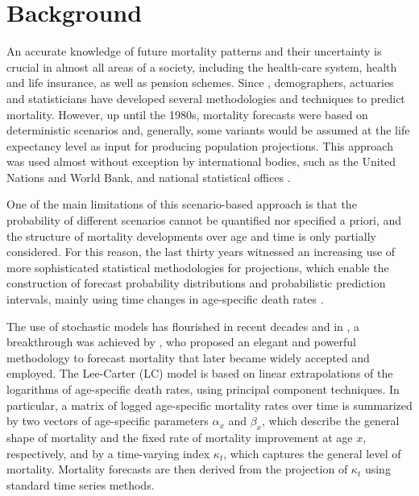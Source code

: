 \documentclass[Thesis]{subfiles}
\begin{document}
\newpage


\normalsize

\section{Background}\label{Sec:Ch6sec1}
An accurate knowledge of future mortality patterns and their uncertainty is crucial in almost all areas of a society, including the health-care system, health and life insurance, as well as pension schemes. Since \cite{bonynge1852future}, demographers, actuaries and statisticians have developed several methodologies and techniques to predict mortality. However, up until the 1980s, mortality forecasts were based on deterministic scenarios and, generally, some variants would be assumed at the life expectancy level as input for producing population projections. This approach was used almost without exception by international bodies, such as the United Nations and World Bank, and national statistical offices \citep{booth2006demographic}. 

One of the main limitations of this scenario-based approach is that the probability of different scenarios cannot be quantified nor specified a priori, and the structure of mortality developments over age and time is only partially considered. For this reason, the last thirty years witnessed an increasing use of more sophisticated statistical methodologies for projections, which enable the construction of forecast probability distributions and probabilistic prediction intervals, mainly using time changes in age-specific death rates \citep{booth2008mortality}.

The use of stochastic models has flourished in recent decades \citep[for comprehensive reviews, see][]{booth2006demographic,booth2008mortality, stoeldraijer2013impact} and in \citeyear{lee1992modeling}, a breakthrough was achieved by \citeauthor{lee1992modeling}, who proposed an elegant and powerful methodology to forecast mortality that later became widely accepted and employed. The Lee-Carter (LC) model is based on linear extrapolations of the logarithms of age-specific death rates, using principal component techniques. In particular, a matrix of logged age-specific mortality rates over time is summarized by two vectors of age-specific parameters $\alpha_x$ and $\beta_x$, which describe the general shape of mortality and the fixed rate of mortality improvement at age $x$, respectively, and by a time-varying index $\kappa_t$, which captures the general level of mortality. Mortality forecasts are then derived from the projection of $\kappa_t$ using standard time series methods.
\end{document}
